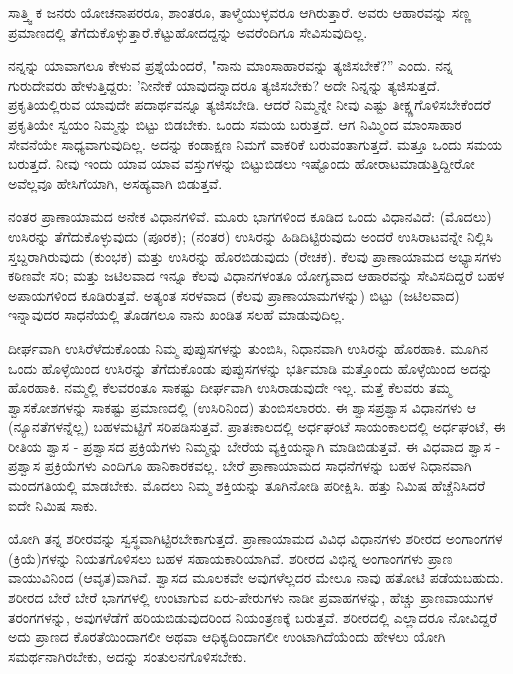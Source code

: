 ಸಾತ್ತ್ವಿ ಕ ಜನರು ಯೋಚನಾಪರರೂ, ಶಾಂತರೂ, ತಾಳ್ಮೆಯುಳ್ಳವರೂ ಆಗಿರುತ್ತಾರೆ. ಅವರು ಆಹಾರವನ್ನು ಸಣ್ಣ ಪ್ರಮಾಣದಲ್ಲಿ ತೆಗೆದುಕೊಳ್ಳುತ್ತಾರೆ.\break ಕೆಟ್ಟುಹೋದದ್ದನ್ನು ಅವರೆಂದಿಗೂ ಸೇವಿಸುವುದಿಲ್ಲ.

ನನ್ನನ್ನು ಯಾವಾಗಲೂ ಕೇಳುವ ಪ್ರಶ್ನೆಯೆಂದರೆ, "ನಾನು ಮಾಂಸಾಹಾರವನ್ನು ತ್ಯಜಿಸಬೇಕೆ?'' ಎಂದು. ನನ್ನ ಗುರುದೇವರು ಹೇಳುತ್ತಿದ್ದರು: 'ನೀನೇಕೆ ಯಾವುದನ್ನಾದರೂ ತ್ಯಜಿಸಬೇಕು? ಅದೇ ನಿನ್ನನ್ನು ತ್ಯಜಿಸುತ್ತದೆ. ಪ್ರಕೃತಿಯಲ್ಲಿರುವ ಯಾವುದೇ ಪದಾರ್ಥವನ್ನೂ ತ್ಯಜಿಸಬೇಡಿ. ಆದರೆ ನಿಮ್ಮನ್ನೇ ನೀವು ಎಷ್ಟು ತೀಕ್ಷ್ಣಗೊಳಿಸಬೇಕೆಂದರೆ ಪ್ರಕೃತಿಯೇ ಸ್ವಯಂ ನಿಮ್ಮನ್ನು ಬಿಟ್ಟು ಬಿಡಬೇಕು. ಒಂದು ಸಮಯ ಬರುತ್ತದೆ. ಆಗ ನಿಮ್ಮಿಂದ ಮಾಂಸಾಹಾರ ಸೇವನೆಯೇ ಸಾಧ್ಯವಾಗುವುದಿಲ್ಲ. ಅದನ್ನು ಕಂಡಾಕ್ಷಣ ನಿಮಗೆ ವಾಕರಿಕೆ ಬರುವಂತಾಗುತ್ತದೆ. ಮತ್ತೂ ಒಂದು ಸಮಯ ಬರುತ್ತದೆ. ನೀವು ಇಂದು ಯಾವ ಯಾವ ವಸ್ತುಗಳನ್ನು ಬಿಟ್ಟುಬಿಡಲು ಇಷ್ಟೊಂದು ಹೋರಾಟ\break ಮಾಡುತ್ತಿದ್ದೀರೋ ಅವೆಲ್ಲವೂ ಹೇಸಿಗೆಯಾಗಿ, ಅಸಹ್ಯವಾಗಿ ಬಿಡುತ್ತವೆ.

ನಂತರ ಪ್ರಾಣಾಯಾಮದ ಅನೇಕ ವಿಧಾನಗಳಿವೆ. ಮೂರು ಭಾಗಗಳಿಂದ ಕೂಡಿದ ಒಂದು ವಿಧಾನವಿದೆ: (ಮೊದಲು) ಉಸಿರನ್ನು ತೆಗೆದುಕೊಳ್ಳುವುದು (ಪೂರಕ); (ನಂತರ) ಉಸಿರನ್ನು ಹಿಡಿದಿಟ್ಟಿರುವುದು ಅಂದರೆ ಉಸಿರಾಟವನ್ನೇ ನಿಲ್ಲಿಸಿ ಸ್ತಬ್ದರಾಗಿರುವುದು (ಕುಂಭಕ) ಮತ್ತು ಉಸಿರನ್ನು ಹೊರಬಿಡುವುದು (ರೇಚಕ). ಕೆಲವು ಪ್ರಾಣಾಯಾಮದ ಅಭ್ಯಾಸಗಳು ಕಠಿಣವೇ ಸರಿ; ಮತ್ತು ಜಟಿಲವಾದ ಇನ್ನೂ ಕೆಲವು ವಿಧಾನಗಳಂತೂ ಯೋಗ್ಯವಾದ ಆಹಾರವನ್ನು ಸೇವಿಸದಿದ್ದರೆ ಬಹಳ ಅಪಾಯಗಳಿಂದ ಕೂಡಿರುತ್ತವೆ. ಅತ್ಯಂತ ಸರಳವಾದ (ಕೆಲವು ಪ್ರಾಣಾಯಾಮಗಳನ್ನು) ಬಿಟ್ಟು (ಜಟಿಲವಾದ) ಇನ್ನಾವುದರ ಸಾಧನೆಯಲ್ಲಿ ತೊಡಗಲೂ ನಾನು ಖಂಡಿತ ಸಲಹೆ ಮಾಡುವುದಿಲ್ಲ.

ದೀರ್ಘವಾಗಿ ಉಸಿರೆಳೆದುಕೊಂಡು ನಿಮ್ಮ ಪುಪ್ಪುಸಗಳನ್ನು ತುಂಬಿಸಿ, ನಿಧಾನವಾಗಿ ಉಸಿರನ್ನು ಹೊರಹಾಕಿ. ಮೂಗಿನ ಒಂದು ಹೊಳ್ಳೆಯಿಂದ ಉಸಿರನ್ನು ತೆಗೆದುಕೊಂಡು ಪುಪ್ಪುಸಗಳನ್ನು ಭರ್ತಿಮಾಡಿ ಮತ್ತೊಂದು ಹೊಳ್ಳೆಯಿಂದ ಅದನ್ನು ಹೊರಹಾಕಿ. ನಮ್ಮಲ್ಲಿ ಕೆಲವರಂತೂ ಸಾಕಷ್ಟು ದೀರ್ಘವಾಗಿ ಉಸಿರಾಡುವುದೇ ಇಲ್ಲ. ಮತ್ತೆ ಕೆಲವರು ತಮ್ಮ ಶ್ವಾಸಕೋಶಗಳನ್ನು ಸಾಕಷ್ಟು ಪ್ರಮಾಣದಲ್ಲಿ (ಉಸಿರಿನಿಂದ) ತುಂಬಿಸಲಾರರು. ಈ ಶ್ವಾಸಪ್ರಶ್ವಾಸ ವಿಧಾನಗಳು ಆ (ನ್ಯೂನತೆಗಳನ್ನೆಲ್ಲ) ಬಹಳಮಟ್ಟಿಗೆ ಸರಿಪಡಿಸುತ್ತವೆ. ಪ್ರಾತಃಕಾಲದಲ್ಲಿ ಅರ್ಧಘಂಟೆ ಸಾಯಂಕಾಲದಲ್ಲಿ ಅರ್ಧಘಂಟೆ, ಈ ರೀತಿಯ ಶ್ವಾಸ - ಪ್ರಶ್ವಾಸದ ಪ್ರಕ್ರಿಯೆಗಳು ನಿಮ್ಮನ್ನು ಬೇರೆಯ ವ್ಯಕ್ತಿಯನ್ನಾಗಿ ಮಾಡಿಬಿಡುತ್ತವೆ. ಈ ವಿಧವಾದ ಶ್ವಾಸ - ಪ್ರಶ್ವಾಸ ಪ್ರಕ್ರಿಯೆಗಳು ಎಂದಿಗೂ ಹಾನಿಕಾರಕವಲ್ಲ. ಬೇರೆ ಪ್ರಾಣಾಯಾಮದ ಸಾಧನೆಗಳನ್ನು ಬಹಳ ನಿಧಾನವಾಗಿ ಮಂದಗತಿಯಲ್ಲಿ ಮಾಡಬೇಕು. ಮೊದಲು ನಿಮ್ಮ ಶಕ್ತಿಯನ್ನು ತೂಗಿನೋಡಿ ಪರೀಕ್ಷಿಸಿ. ಹತ್ತು ನಿಮಿಷ ಹೆಚ್ಚೆನಿಸಿದರೆ ಐದೇ ನಿಮಿಷ ಸಾಕು.

ಯೋಗಿ ತನ್ನ ಶರೀರವನ್ನು ಸ್ವಸ್ಥವಾಗಿಟ್ಟಿರಬೇಕಾಗುತ್ತದೆ. ಪ್ರಾಣಾಯಾಮದ ವಿವಿಧ ವಿಧಾನಗಳು ಶರೀರದ ಅಂಗಾಂಗಗಳ (ಕ್ರಿಯೆ)ಗಳನ್ನು ನಿಯತಗೊಳಿಸಲು ಬಹಳ ಸಹಾಯಕಾರಿಯಾಗಿವೆ. ಶರೀರದ ವಿಭಿನ್ನ ಅಂಗಾಂಗಗಳು ಪ್ರಾಣ ವಾಯುವಿನಿಂದ (ಆವೃತ)ವಾಗಿವೆ. ಶ್ವಾಸದ ಮೂಲಕವೇ ಅವುಗಳೆಲ್ಲದರ ಮೇಲೂ ನಾವು ಹತೋಟಿ ಪಡೆಯಬಹುದು. ಶರೀರದ ಬೇರೆ ಬೇರೆ ಭಾಗಗಳಲ್ಲಿ ಉಂಟಾಗುವ ಏರು-ಪೇರುಗಳು ನಾಡೀ ಪ್ರವಾಹಗಳನ್ನು, ಹೆಚ್ಚು ಪ್ರಾಣವಾಯುಗಳ ತರಂಗಗಳನ್ನು, ಅವುಗಳೆಡೆಗೆ ಹರಿಯಬಿಡುವುದರಿಂದ ನಿಯಂತ್ರಣಕ್ಕೆ ಬರುತ್ತವೆ. ಶರೀರದಲ್ಲಿ ಎಲ್ಲಾದರೂ ನೋವಿದ್ದರೆ ಅದು ಪ್ರಾಣದ ಕೊರತೆಯಿಂದಾಗಲೀ ಅಥವಾ ಆಧಿಕ್ಯದಿಂದಾಗಲೀ ಉಂಟಾಗಿದೆಯೆಂದು ಹೇಳಲು ಯೋಗಿ ಸಮರ್ಥನಾಗಿರಬೇಕು, ಅದನ್ನು ಸಂತುಲನಗೊಳಿಸಬೇಕು.

